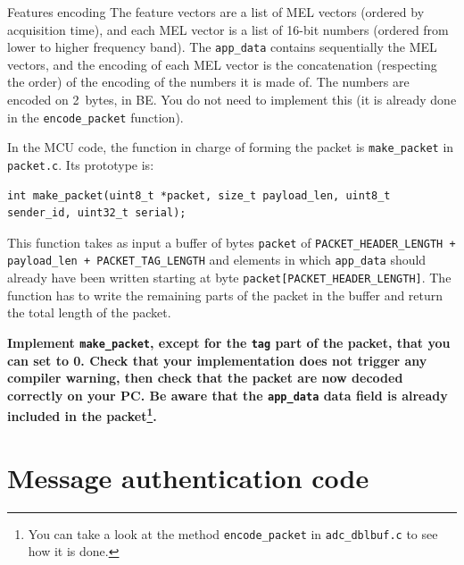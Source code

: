 \begin{bclogo}[couleur = gray!20, arrondi = 0.2, logo=\bcinfo]{Features encoding}
    The feature vectors are a list of MEL vectors (ordered by acquisition
    time), and each MEL vector is a list of 16-bit numbers (ordered from lower
    to higher frequency band).
    The \texttt{app\_data} contains sequentially the MEL vectors, and the
    encoding of each MEL vector is the concatenation (respecting the order) of
    the encoding of the numbers it is made of.  The numbers are encoded on
    2~bytes, in BE.
    You do not need to implement this (it is already done in the \verb|encode_packet| function).
\end{bclogo}

In the MCU code, the function in charge of forming the packet is
\verb|make_packet| in \texttt{packet.c}.
Its prototype is:
\begin{lstlisting}[style=customc]
int make_packet(uint8_t *packet, size_t payload_len, uint8_t sender_id, uint32_t serial);
\end{lstlisting}
This function takes as input a buffer of bytes \texttt{packet} of
\texttt{PACKET\_HEADER\_LENGTH + payload\_len + PACKET\_TAG\_LENGTH} and elements in
which \texttt{app\_data} should already have been written starting at byte
\verb|packet[PACKET_HEADER_LENGTH]|.
The function has to write the remaining parts of the packet in the buffer and
return the total length of the packet.

\textbf{
    Implement \texttt{make\_packet}, except for the \texttt{tag} part of the
    packet, that you can set to 0.
    Check that your implementation does not trigger any compiler warning, then
    check that the packet are now decoded correctly on your PC. Be aware that the \texttt{app\_data} data field is already included in the packet\footnote{You can take a look at the method \texttt{encode\_packet} in \texttt{adc\_dblbuf.c} to see how it is done.}.
}

\section{Message authentication code}

